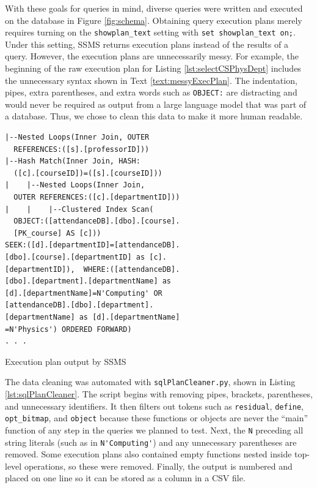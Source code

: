With these goals for queries in mind, \dataRows diverse queries were written and executed on the database in Figure \ref{fig:schema}. Obtaining query execution plans merely requires turning on the \lstinline{showplan_text} setting with \lstinline{set showplan_text on;}. Under this setting, SSMS returns execution plans instead of the results of a query. However, the execution plans are unnecessarily messy. For example, the beginning of the raw execution plan for Listing \ref{lst:selectCSPhysDept} includes the unnecessary syntax shown in Text \ref{text:messyExecPlan}. The indentation, pipes, extra parentheses, and extra words such as \lstinline{OBJECT:} are distracting and would never be required as output from a large language model that was part of a database. Thus, we chose to clean this data to make it more human readable.

\begin{text}
  \begin{verbatim}
|--Nested Loops(Inner Join, OUTER
  REFERENCES:([s].[professorID]))
|--Hash Match(Inner Join, HASH:
  ([c].[courseID])=([s].[courseID]))
|    |--Nested Loops(Inner Join,
  OUTER REFERENCES:([c].[departmentID]))
|    |    |--Clustered Index Scan(
  OBJECT:([attendanceDB].[dbo].[course].
  [PK_course] AS [c]))
SEEK:([d].[departmentID]=[attendanceDB].
[dbo].[course].[departmentID] as [c].
[departmentID]),  WHERE:([attendanceDB].
[dbo].[department].[departmentName] as 
[d].[departmentName]=N'Computing' OR
[attendanceDB].[dbo].[department].
[departmentName] as [d].[departmentName]
=N'Physics') ORDERED FORWARD)
. . .\end{verbatim}
  \caption{Execution plan output by SSMS}
  \label{text:messyExecPlan}
\end{text}

The data cleaning was automated with \lstinline{sqlPlanCleaner.py}, shown in Listing \ref{lst:sqlPlanCleaner}. The script begins with removing pipes, brackets, parentheses, and unnecessary identifiers. It then filters out tokens such as \lstinline{residual}, \lstinline{define}, \lstinline{opt_bitmap}, and \lstinline{object} because these functions or objects are never the ``main'' function of any step in the queries we planned to test. Next, the \lstinline{N} preceding all string literals (such as in \lstinline{N'Computing'}) and any unnecessary parentheses are removed. Some execution plans also contained empty functions nested inside top-level operations, so these were removed. Finally, the output is numbered and placed on one line so it can be stored as a column in a CSV file.

